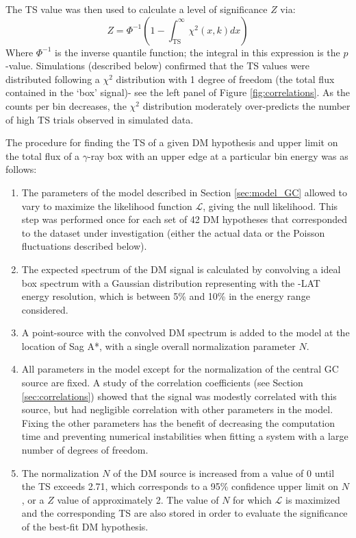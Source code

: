 The TS value was then used to calculate a level of significance $Z$ via:
\begin{equation}
Z = \Phi ^{-1} \left( 1-\int_\mathrm{TS}^\infty \chi^2(x,k)dx\right)
\end{equation}
Where $\Phi ^{-1}$ is the inverse quantile function; the integral in this expression is the $p$-value.
Simulations (described below) confirmed that the TS values were distributed following a $\chi^2$ distribution with 1 degree of freedom (the total flux contained in the `box' signal)- see the left panel of Figure \ref{fig:correlations}. As the counts per bin decreases, the $\chi^{2}$ distribution moderately over-predicts the number of high TS trials observed in simulated data. 

The procedure for finding the TS of a given DM hypothesis and upper limit on the total flux of a $\gamma$-ray box with an upper edge at a particular bin energy was as follows:
\begin{enumerate}\label{sec:procedure}
\item \label{step:fit} The parameters of the model described in Section \ref{sec:model_GC} allowed to vary to maximize the likelihood function $\mathcal{L}$, giving the null likelihood.
This step was performed once for each set of 42 DM hypotheses that corresponded to the dataset under investigation (either the actual data or the Poisson fluctuations described below). 
\item The expected spectrum of the DM signal is calculated by convolving a ideal box spectrum with a Gaussian distribution representing with the \Fermi-LAT energy resolution, which is between 5\% and 10\% in the energy range considered. 
\item A point-source with the convolved DM spectrum is added to the model at the location of Sag A*, with a single overall normalization parameter $N$.
\item All parameters in the model except for the normalization of the central GC source are fixed.
A study of the correlation coefficients (see Section \ref{sec:correlations}) showed that the signal was modestly correlated with this source, but had negligible correlation with other parameters in the model.
Fixing the other parameters has the benefit of decreasing the computation time and preventing numerical instabilities when fitting a system with a large number of degrees of freedom.
\item The normalization $N$ of the DM source is increased from a value of 0 until the TS exceeds 2.71, which corresponds to a 95\% confidence upper limit on $N$, or a $Z$ value of approximately 2. The value of $N$ for which $\mathcal{L}$ is maximized and the corresponding TS are also stored in order to evaluate the significance of the best-fit DM hypothesis.
\end{enumerate}



